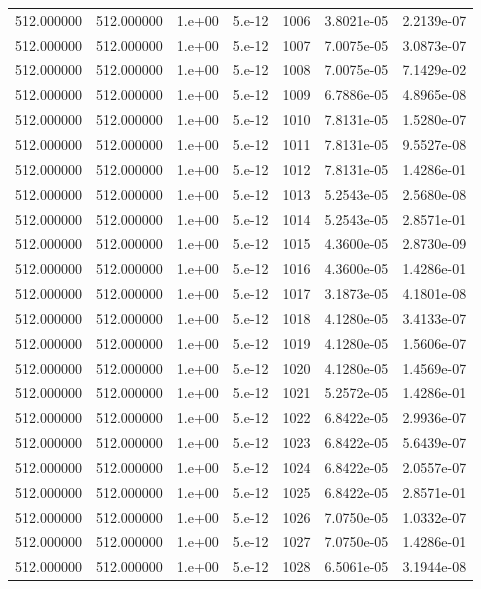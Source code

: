 \begin{table}[htbp]
\begin{tabular}{rrrrrrr}
512.000000 & 512.000000 & 1.e+00 & 5.e-12 & 1006 & 3.8021e-05 & 2.2139e-07 \\
512.000000 & 512.000000 & 1.e+00 & 5.e-12 & 1007 & 7.0075e-05 & 3.0873e-07 \\
512.000000 & 512.000000 & 1.e+00 & 5.e-12 & 1008 & 7.0075e-05 & 7.1429e-02 \\
512.000000 & 512.000000 & 1.e+00 & 5.e-12 & 1009 & 6.7886e-05 & 4.8965e-08 \\
512.000000 & 512.000000 & 1.e+00 & 5.e-12 & 1010 & 7.8131e-05 & 1.5280e-07 \\
512.000000 & 512.000000 & 1.e+00 & 5.e-12 & 1011 & 7.8131e-05 & 9.5527e-08 \\
512.000000 & 512.000000 & 1.e+00 & 5.e-12 & 1012 & 7.8131e-05 & 1.4286e-01 \\
512.000000 & 512.000000 & 1.e+00 & 5.e-12 & 1013 & 5.2543e-05 & 2.5680e-08 \\
512.000000 & 512.000000 & 1.e+00 & 5.e-12 & 1014 & 5.2543e-05 & 2.8571e-01 \\
512.000000 & 512.000000 & 1.e+00 & 5.e-12 & 1015 & 4.3600e-05 & 2.8730e-09 \\
512.000000 & 512.000000 & 1.e+00 & 5.e-12 & 1016 & 4.3600e-05 & 1.4286e-01 \\
512.000000 & 512.000000 & 1.e+00 & 5.e-12 & 1017 & 3.1873e-05 & 4.1801e-08 \\
512.000000 & 512.000000 & 1.e+00 & 5.e-12 & 1018 & 4.1280e-05 & 3.4133e-07 \\
512.000000 & 512.000000 & 1.e+00 & 5.e-12 & 1019 & 4.1280e-05 & 1.5606e-07 \\
512.000000 & 512.000000 & 1.e+00 & 5.e-12 & 1020 & 4.1280e-05 & 1.4569e-07 \\
512.000000 & 512.000000 & 1.e+00 & 5.e-12 & 1021 & 5.2572e-05 & 1.4286e-01 \\
512.000000 & 512.000000 & 1.e+00 & 5.e-12 & 1022 & 6.8422e-05 & 2.9936e-07 \\
512.000000 & 512.000000 & 1.e+00 & 5.e-12 & 1023 & 6.8422e-05 & 5.6439e-07 \\
512.000000 & 512.000000 & 1.e+00 & 5.e-12 & 1024 & 6.8422e-05 & 2.0557e-07 \\
512.000000 & 512.000000 & 1.e+00 & 5.e-12 & 1025 & 6.8422e-05 & 2.8571e-01 \\
512.000000 & 512.000000 & 1.e+00 & 5.e-12 & 1026 & 7.0750e-05 & 1.0332e-07 \\
512.000000 & 512.000000 & 1.e+00 & 5.e-12 & 1027 & 7.0750e-05 & 1.4286e-01 \\
512.000000 & 512.000000 & 1.e+00 & 5.e-12 & 1028 & 6.5061e-05 & 3.1944e-08 \\

\end{tabular}
\end{table}
